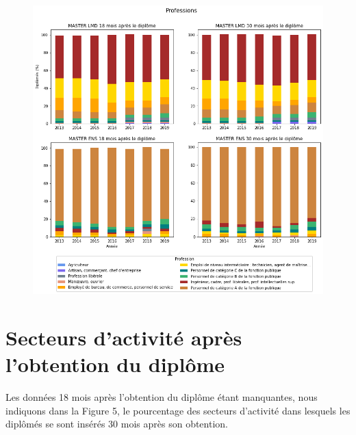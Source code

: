 \documentclass[12pt, a4paper, titlepage, table]{article}
\begin{document}
		\begin{figure}[H]
			\centering
			\includegraphics[width=1\textwidth]{../graphs/repartition_professions_situation_2.png}
			\label{fig:profession_pourcentage_2}
		\end{figure}


\section{Secteurs d'activité après l'obtention du diplôme}
	Les données 18 mois après l'obtention du diplôme étant manquantes, nous indiquons dans la Figure 5, le pourcentage des secteurs d'activité dans lesquels les diplômés se sont insérés 30 mois après son obtention. 
\end{document}
